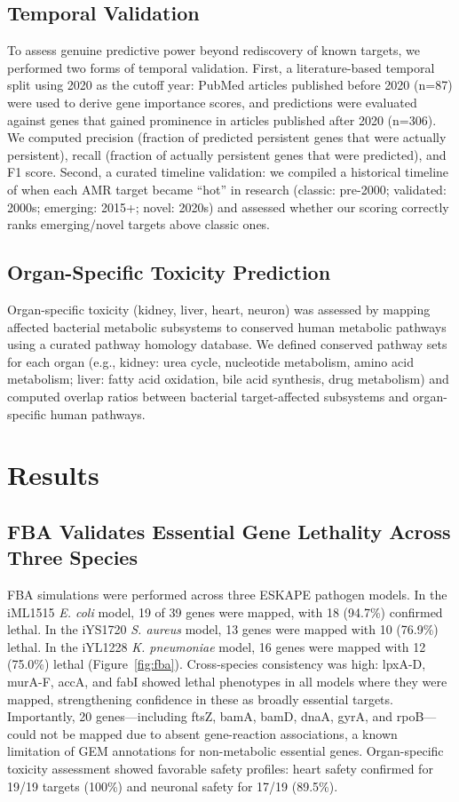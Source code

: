 \documentclass[12pt,a4paper]{article}
\begin{document}
\subsection{Temporal Validation}
To assess genuine predictive power beyond rediscovery of known targets, we performed two forms of temporal validation. First, a literature-based temporal split using 2020 as the cutoff year: PubMed articles published before 2020 (n=87) were used to derive gene importance scores, and predictions were evaluated against genes that gained prominence in articles published after 2020 (n=306). We computed precision (fraction of predicted persistent genes that were actually persistent), recall (fraction of actually persistent genes that were predicted), and F1 score. Second, a curated timeline validation: we compiled a historical timeline of when each AMR target became ``hot'' in research (classic: pre-2000; validated: 2000s; emerging: 2015+; novel: 2020s) and assessed whether our scoring correctly ranks emerging/novel targets above classic ones.

\subsection{Organ-Specific Toxicity Prediction}
Organ-specific toxicity (kidney, liver, heart, neuron) was assessed by mapping affected bacterial metabolic subsystems to conserved human metabolic pathways using a curated pathway homology database. We defined conserved pathway sets for each organ (e.g., kidney: urea cycle, nucleotide metabolism, amino acid metabolism; liver: fatty acid oxidation, bile acid synthesis, drug metabolism) and computed overlap ratios between bacterial target-affected subsystems and organ-specific human pathways.

\section{Results}

\subsection{FBA Validates Essential Gene Lethality Across Three Species}
FBA simulations were performed across three ESKAPE pathogen models. In the iML1515 \textit{E. coli} model, 19 of 39 genes were mapped, with 18 (94.7\%) confirmed lethal. In the iYS1720 \textit{S. aureus} model, 13 genes were mapped with 10 (76.9\%) lethal. In the iYL1228 \textit{K. pneumoniae} model, 16 genes were mapped with 12 (75.0\%) lethal (Figure~\ref{fig:fba}). Cross-species consistency was high: lpxA-D, murA-F, accA, and fabI showed lethal phenotypes in all models where they were mapped, strengthening confidence in these as broadly essential targets. Importantly, 20 genes---including ftsZ, bamA, bamD, dnaA, gyrA, and rpoB---could not be mapped due to absent gene-reaction associations, a known limitation of GEM annotations for non-metabolic essential genes. Organ-specific toxicity assessment showed favorable safety profiles: heart safety confirmed for 19/19 targets (100\%) and neuronal safety for 17/19 (89.5\%).
\end{document}
